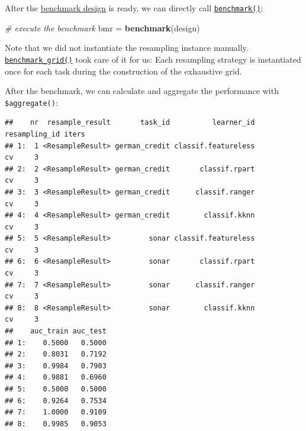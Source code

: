 \documentclass[]{scrbook}
\newenvironment{Shaded}{\begin{snugshade}}{\end{snugshade}}
\newcommand{\CommentTok}[1]{\textcolor[rgb]{0.56,0.35,0.01}{\textit{#1}}}
\newcommand{\DataTypeTok}[1]{\textcolor[rgb]{0.13,0.29,0.53}{#1}}
\newcommand{\KeywordTok}[1]{\textcolor[rgb]{0.13,0.29,0.53}{\textbf{#1}}}
\newcommand{\NormalTok}[1]{#1}
\newcommand{\OperatorTok}[1]{\textcolor[rgb]{0.81,0.36,0.00}{\textbf{#1}}}
\newcommand{\StringTok}[1]{\textcolor[rgb]{0.31,0.60,0.02}{#1}}
\renewenvironment{Shaded} {\begin{snugshade}\small} {\end{snugshade}}
\begin{document}
After the \protect\hyperlink{bm-design}{benchmark design} is ready, we can directly call \href{https://mlr3.mlr-org.com/reference/benchmark.html}{\texttt{benchmark()}}:

\begin{Shaded}
\begin{Highlighting}[]
\CommentTok{# execute the benchmark}
\NormalTok{bmr =}\StringTok{ }\KeywordTok{benchmark}\NormalTok{(design)}
\end{Highlighting}
\end{Shaded}

Note that we did not instantiate the resampling instance manually.
\href{https://mlr3.mlr-org.com/reference/benchmark_grid.html}{\texttt{benchmark\_grid()}} took care of it for us:
Each resampling strategy is instantiated once for each task during the construction of the exhaustive grid.

After the benchmark, we can calculate and aggregate the performance with \texttt{\$aggregate()}:

\begin{Shaded}
\end{Shaded}

\begin{verbatim}
##    nr  resample_result       task_id          learner_id resampling_id iters
## 1:  1 <ResampleResult> german_credit classif.featureless            cv     3
## 2:  2 <ResampleResult> german_credit       classif.rpart            cv     3
## 3:  3 <ResampleResult> german_credit      classif.ranger            cv     3
## 4:  4 <ResampleResult> german_credit        classif.kknn            cv     3
## 5:  5 <ResampleResult>         sonar classif.featureless            cv     3
## 6:  6 <ResampleResult>         sonar       classif.rpart            cv     3
## 7:  7 <ResampleResult>         sonar      classif.ranger            cv     3
## 8:  8 <ResampleResult>         sonar        classif.kknn            cv     3
##    auc_train auc_test
## 1:    0.5000   0.5000
## 2:    0.8031   0.7192
## 3:    0.9984   0.7903
## 4:    0.9881   0.6960
## 5:    0.5000   0.5000
## 6:    0.9264   0.7534
## 7:    1.0000   0.9109
## 8:    0.9985   0.9053
\end{verbatim}
\end{document}
